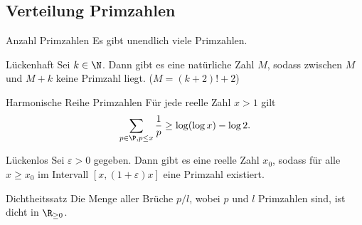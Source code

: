 \subsection{Verteilung Primzahlen}

\begin{karte}{Anzahl Primzahlen}
    Es gibt unendlich viele Primzahlen.
\end{karte}

\begin{karte}{Lückenhaft}
    Sei \(k\in\N\). Dann gibt es eine natürliche Zahl \(M\), sodass zwischen 
    \(M\) und \(M+k\) keine Primzahl liegt. (\(M=(k+2)! + 2\))
\end{karte}

\begin{karte}{Harmonische Reihe Primzahlen}
    Für jede reelle Zahl \(x > 1\) gilt 
    \[ \sum_{p\in \P, p\leq x} \frac{1}{p} \geq \log(\log x) - \log 2. \]
\end{karte}

\begin{karte}{Lückenlos}
    Sei \(\varepsilon > 0\) gegeben. Dann gibt es eine reelle Zahl \(x_0\), sodass 
    für alle \(x\geq x_0\) im Intervall \([x,(1+\varepsilon)x]\) eine Primzahl existiert.
\end{karte}

\begin{karte}{Dichtheitssatz}
    Die Menge aller Brüche \(p/l\), wobei \(p\) und \(l\) Primzahlen sind, ist 
    dicht in \(\R_{\geq 0}\).
\end{karte}